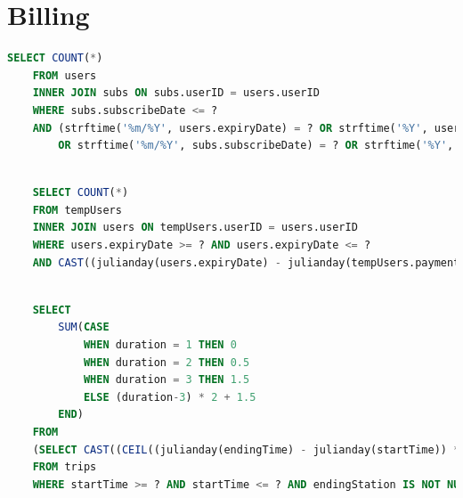 \documentclass[a4paper,11pt]{report}
\begin{document}
    \section{Billing}
    \begin{lstlisting}[language=sql]
    SELECT COUNT(*) 
    FROM users
    INNER JOIN subs ON subs.userID = users.userID
    WHERE subs.subscribeDate <= ?
    AND (strftime('%m/%Y', users.expiryDate) = ? OR strftime('%Y', users.expiryDate) = ?) 
        OR strftime('%m/%Y', subs.subscribeDate) = ? OR strftime('%Y', subs.subscribeDate) = ?
    \end{lstlisting}

    \begin{lstlisting}[language=sql]

    SELECT COUNT(*)
    FROM tempUsers
    INNER JOIN users ON tempUsers.userID = users.userID
    WHERE users.expiryDate >= ? AND users.expiryDate <= ?
    AND CAST((julianday(users.expiryDate) - julianday(tempUsers.paymentDate)) AS INTEGER) == ?
    \end{lstlisting}

    \begin{lstlisting}[language=sql]

    SELECT
        SUM(CASE 
            WHEN duration = 1 THEN 0 
            WHEN duration = 2 THEN 0.5 
            WHEN duration = 3 THEN 1.5 
            ELSE (duration-3) * 2 + 1.5 
        END)
    FROM 
    (SELECT CAST((CEIL((julianday(endingTime) - julianday(startTime)) * 48.0)) AS INTEGER) AS duration
    FROM trips
    WHERE startTime >= ? AND startTime <= ? AND endingStation IS NOT NULL AND endingTime IS NOT NULL)
    \end{lstlisting}
\end{document}

